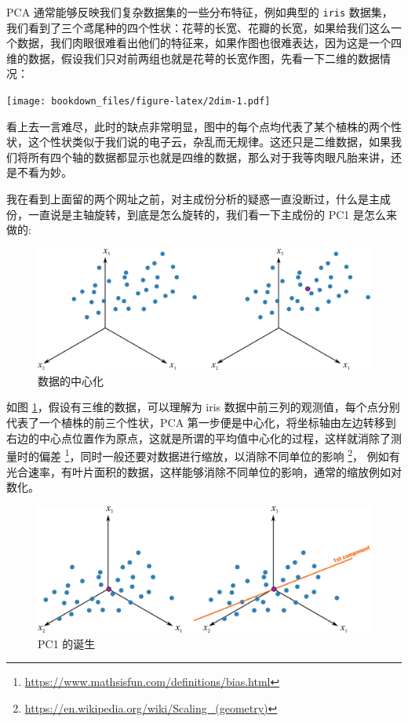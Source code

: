 \documentclass[
]{krantz}
\begin{document}
PCA 通常能够反映我们复杂数据集的一些分布特征，例如典型的 \texttt{iris} 数据集，我们看到了三个鸢尾种的四个性状：花萼的长宽、花瓣的长宽，如果给我们这么一个数据，我们肉眼很难看出他们的特征来，如果作图也很难表达，因为这是一个四维的数据，假设我们只对前两组也就是花萼的长宽作图，先看一下二维的数据情况：

\texttt{[image: bookdown\_files/figure-latex/2dim-1.pdf]}

看上去一言难尽，此时的缺点非常明显，图中的每个点均代表了某个植株的两个性状，这个性状类似于我们说的电子云，杂乱而无规律。这还只是二维数据，如果我们将所有四个轴的数据都显示也就是四维的数据，那么对于我等肉眼凡胎来讲，还是不看为妙。

我在看到上面留的两个网址之前，对主成份分析的疑惑一直没断过，什么是主成份，一直说是主轴旋转，到底是怎么旋转的，我们看一下主成份的 PC1 是怎么来做的:

\begin{figure}
\includegraphics[width=1\linewidth]{images/pc1} \caption{数据的中心化}\label{fig:pccenter}
\end{figure}

如图 \ref{fig:pccenter}，假设有三维的数据，可以理解为 iris 数据中前三列的观测值，每个点分别代表了一个植株的前三个性状，PCA 第一步便是中心化，将坐标轴由左边转移到右边的中心点位置作为原点，这就是所谓的平均值中心化的过程，这样就消除了测量时的偏差 \footnote{\url{https://www.mathsisfun.com/definitions/bias.html}}，同时一般还要对数据进行缩放，以消除不同单位的影响 \footnote{\url{https://en.wikipedia.org/wiki/Scaling_(geometry)}}，
例如有光合速率，有叶片面积的数据，这样能够消除不同单位的影响，通常的缩放例如对数化。

\begin{figure}
\includegraphics[width=1\linewidth]{images/pc2} \caption{PC1 的诞生}\label{fig:pc2}
\end{figure}
\end{document}
